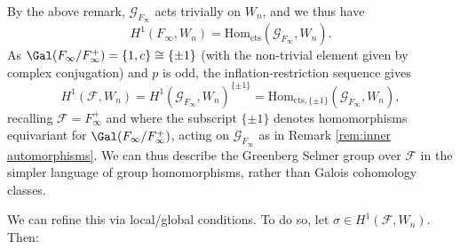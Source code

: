 \documentclass[a4paper,10pt, english, reqno]{smfart}
\newcommand{\cF}{\mathcal{F}}
\numberwithin{equation}{section}
\begin{document}
By the above remark, $\mathscr{G}_{F_\infty}$ acts trivially on $W_n$, and we thus have 
\[
    H^1(F_\infty, W_n) = \mathrm{Hom}_{\mathrm{cts}}(\mathscr{G}_{F_\infty}, W_n).
\]
As $\Gal(F_\infty/F_\infty^+) = \{1,c\} \cong \{\pm 1\}$ (with the non-trivial element given by complex conjugation) and $p$ is odd, the inflation-restriction sequence gives
\[
    H^1(\cF,W_n) = H^1(\mathscr{G}_{F_\infty},W_n)^{\{\pm1\}} = \mathrm{Hom}_{\mathrm{cts}, \{\pm 1\}}(\mathscr{G}_{F_\infty}, W_n),
\]
recalling $\cF = F_\infty^+$ and where the subscript $\{\pm1\}$ denotes homomorphisms equivariant for $\Gal(F_\infty/F_\infty^+)$, acting on $\mathscr{G}_{F_\infty}$ as in Remark \ref{rem:inner automorphisms}. We can thus describe the Greenberg Selmer group over $\cF$ in the simpler language of group homomorphisms, rather than Galois cohomology classes.

We can refine this via local/global conditions. To do so, let $\sigma \in H^1(\cF,W_n)$. Then:
\end{document}
